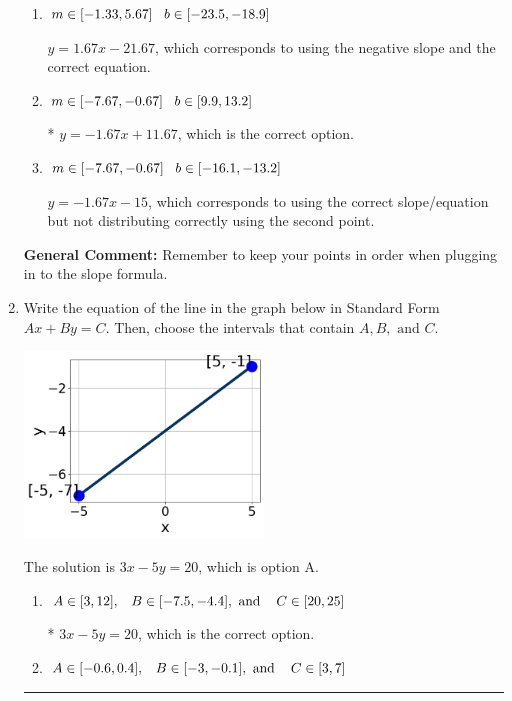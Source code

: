 \documentclass{extbook}[14pt]
\newcommand{\litem}[1]{\item #1

\rule{\textwidth}{0.4pt}}
\begin{document}
\begin{enumerate}
{\begin{enumerate}[label=\Alph*.]
 $y = -1.67x -11.67$, which corresponds to using the correct slope and getting the negative y-intercept.
\item \( m \in [-1.33, 5.67] \hspace*{3mm} b \in [-23.5, -18.9] \)

 $y = 1.67x -21.67$, which corresponds to using the negative slope and the correct equation.
\item \( m \in [-7.67, -0.67] \hspace*{3mm} b \in [9.9, 13.2] \)

* $y = -1.67x + 11.67$, which is the correct option.
\item \( m \in [-7.67, -0.67] \hspace*{3mm} b \in [-16.1, -13.2] \)

 $y = -1.67x -15$, which corresponds to using the correct slope/equation but not distributing correctly using the second point.
\end{enumerate}

\textbf{General Comment:} Remember to keep your points in order when plugging in to the slope formula.
}
\litem{
Write the equation of the line in the graph below in Standard Form $Ax+By=C$. Then, choose the intervals that contain $A, B, \text{ and } C$.

\begin{center}
    \includegraphics[width=0.5\textwidth]{../Figures/linearGraphToStandardB.png}
\end{center}


The solution is \( 3x - 5y = 20 \), which is option A.\begin{enumerate}[label=\Alph*.]
\item \( A \in [3, 12], \hspace{3mm} B \in [-7.5, -4.4], \text{ and } \hspace{3mm} C \in [20, 25] \)

* $3x - 5y = 20$, which is the correct option.
\item \( A \in [-0.6, 0.4], \hspace{3mm} B \in [-3, -0.1], \text{ and } \hspace{3mm} C \in [3, 7] \)


\end{enumerate}}
\end{enumerate}
\end{document}
